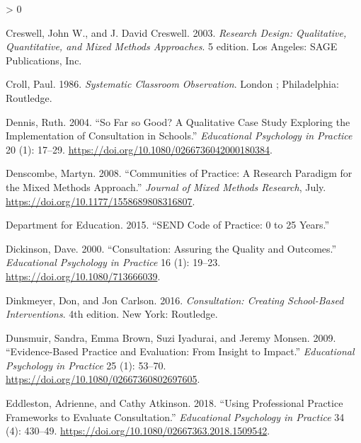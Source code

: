\documentclass[
]{article}
\newlength{\cslhangindent}
\newenvironment{CSLReferences}[2] %
 {%
  \setlength{\parindent}{0pt}
  \ifodd #1 \everypar{\setlength{\hangindent}{\cslhangindent}}\ignorespaces\fi
  \ifnum #2 > 0
  \setlength{\parskip}{#2\baselineskip}
  \fi
 }%
 {}
\begin{document}
\begin{CSLReferences}{1}{0}
\leavevmode\hypertarget{ref-creswellResearchDesignQualitative2003a}{}%
Creswell, John W., and J. David Creswell. 2003. \emph{Research {Design}:
{Qualitative}, {Quantitative}, and {Mixed Methods Approaches}}. 5
edition. {Los Angeles}: {SAGE Publications, Inc}.

\leavevmode\hypertarget{ref-crollSystematicClassroomObservation1986}{}%
Croll, Paul. 1986. \emph{Systematic {Classroom Observation}}. {London ;
Philadelphia}: {Routledge}.

\leavevmode\hypertarget{ref-dennisFarGoodQualitative2004}{}%
Dennis, Ruth. 2004. {``So Far so Good? {A} Qualitative Case Study
Exploring the Implementation of Consultation in Schools.''}
\emph{Educational Psychology in Practice} 20 (1): 17--29.
\url{https://doi.org/10.1080/0266736042000180384}.

\leavevmode\hypertarget{ref-denscombeCommunitiesPracticeResearch2008}{}%
Denscombe, Martyn. 2008. {``Communities of {Practice}: {A Research
Paradigm} for the {Mixed Methods Approach}.''} \emph{Journal of Mixed
Methods Research}, July. \url{https://doi.org/10.1177/1558689808316807}.

\leavevmode\hypertarget{ref-departmentforeducationSENDCodePractice2015}{}%
Department for Education. 2015. {``{SEND} Code of Practice: 0 to 25
Years.''}

\leavevmode\hypertarget{ref-dickinsonConsultationAssuringQuality2000a}{}%
Dickinson, Dave. 2000. {``Consultation: {Assuring} the Quality and
Outcomes.''} \emph{Educational Psychology in Practice} 16 (1): 19--23.
\url{https://doi.org/10.1080/713666039}.

\leavevmode\hypertarget{ref-dinkmeyerConsultationCreatingSchoolBased2016}{}%
Dinkmeyer, Don, and Jon Carlson. 2016. \emph{Consultation: {Creating
School}-{Based Interventions}}. 4th edition. {New York}: {Routledge}.

\leavevmode\hypertarget{ref-dunsmuirEvidenceBasedPractice2009}{}%
Dunsmuir, Sandra, Emma Brown, Suzi Iyadurai, and Jeremy Monsen. 2009.
{``Evidence-Based Practice and Evaluation: From Insight to Impact.''}
\emph{Educational Psychology in Practice} 25 (1): 53--70.
\url{https://doi.org/10.1080/02667360802697605}.

\leavevmode\hypertarget{ref-eddlestonUsingProfessionalPractice2018}{}%
Eddleston, Adrienne, and Cathy Atkinson. 2018. {``Using Professional
Practice Frameworks to Evaluate Consultation.''} \emph{Educational
Psychology in Practice} 34 (4): 430--49.
\url{https://doi.org/10.1080/02667363.2018.1509542}.


\end{CSLReferences}
\end{document}
